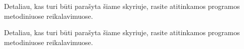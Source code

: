 \documentclass[]{VUMIFTemplateClass}
\begin{document}

Detaliau, kas turi būti parašyta šiame skyriuje, rasite atitinkamos programos metodiniuose reikalavimuose. 

Detaliau, kas turi būti parašyta šiame skyriuje, rasite atitinkamos programos metodiniuose reikalavimuose. 

\printbibliography[title = {Šaltiniai}]






\end{document}
